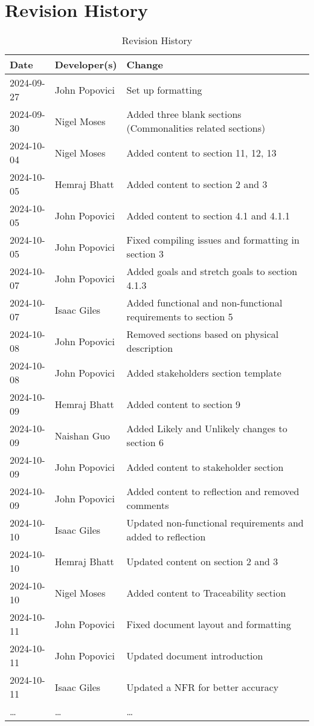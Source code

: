 \section*{Revision History}

\begin{table}[hp]
\caption{Revision History} \label{TblRevisionHistory}
\begin{tabularx}{\textwidth}{llX}
\toprule
\textbf{Date} & \textbf{Developer(s)} & \textbf{Change}\\
\midrule
2024-09-27 & John Popovici & Set up formatting\\
2024-09-30 & Nigel Moses & Added three blank sections (Commonalities related sections)\\
2024-10-04 & Nigel Moses & Added content to section 11, 12, 13\\
2024-10-05 & Hemraj Bhatt & Added content to section 2 and 3\\
2024-10-05 & John Popovici & Added content to section 4.1 and 4.1.1\\
2024-10-05 & John Popovici & Fixed compiling issues and formatting in section 3\\
2024-10-07 & John Popovici & Added goals and stretch goals to section 4.1.3\\
2024-10-07 & Isaac Giles & Added functional and non-functional requirements to section 5\\
2024-10-08 & John Popovici & Removed sections based on physical description\\
2024-10-08 & John Popovici & Added stakeholders section template\\
2024-10-09 & Hemraj Bhatt & Added content to section 9\\
2024-10-09 & Naishan Guo & Added Likely and Unlikely changes to section 6\\
2024-10-09 & John Popovici & Added content to stakeholder section\\
2024-10-09 & John Popovici & Added content to reflection and removed comments\\
2024-10-10 & Isaac Giles & Updated non-functional requirements and added to reflection\\
2024-10-10 & Hemraj Bhatt & Updated content on section 2 and 3\\
2024-10-10 & Nigel Moses & Added content to Traceability section\\
2024-10-11 & John Popovici & Fixed document layout and formatting\\
2024-10-11 & John Popovici & Updated document introduction\\
2024-10-11 & Isaac Giles & Updated a NFR for better accuracy\\
\dots & \dots & \dots\\
\bottomrule
\end{tabularx}
\end{table}

